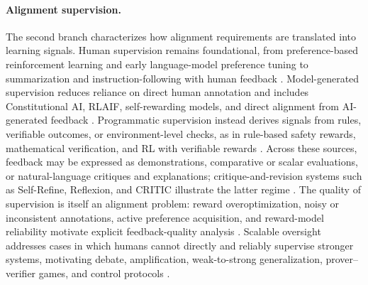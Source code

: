\documentclass[10pt,a4paper,twocolumn]{article}
\begin{document}
\paragraph{Alignment supervision.}
The second branch characterizes how alignment requirements are translated into learning signals. Human supervision remains foundational, from preference-based reinforcement learning and early language-model preference tuning to summarization and instruction-following with human feedback \citep{christiano2017preferences,ziegler2019finetuning,stiennon2020summarize,ouyang2022instructgpt}. Model-generated supervision reduces reliance on direct human annotation and includes Constitutional AI, RLAIF, self-rewarding models, and direct alignment from AI-generated feedback \citep{bai2022constitutional,lee2024rlaif,yuan2024selfrewarding,liu2024dlma}. Programmatic supervision instead derives signals from rules, verifiable outcomes, or environment-level checks, as in rule-based safety rewards, mathematical verification, and RL with verifiable rewards \citep{mu2024rulebased,shao2024deepseekmath,deepseek2025r1}. Across these sources, feedback may be expressed as demonstrations, comparative or scalar evaluations, or natural-language critiques and explanations; critique-and-revision systems such as Self-Refine, Reflexion, and CRITIC illustrate the latter regime \citep{madaan2023selfrefine,shinn2023reflexion,gou2024critic}. The quality of supervision is itself an alignment problem: reward overoptimization, noisy or inconsistent annotations, active preference acquisition, and reward-model reliability motivate explicit feedback-quality analysis \citep{gao2023overoptimization,muldrew2024active,cheng2024rime,wang2024rmquality,lambert2025rewardbench}. Scalable oversight addresses cases in which humans cannot directly and reliably supervise stronger systems, motivating debate, amplification, weak-to-strong generalization, prover--verifier games, and control protocols \citep{irving2018debate,christiano2018amplification,burns2024weakstrong,khan2024debate,kirchner2024proververifier,greenblatt2024control}.
\end{document}

